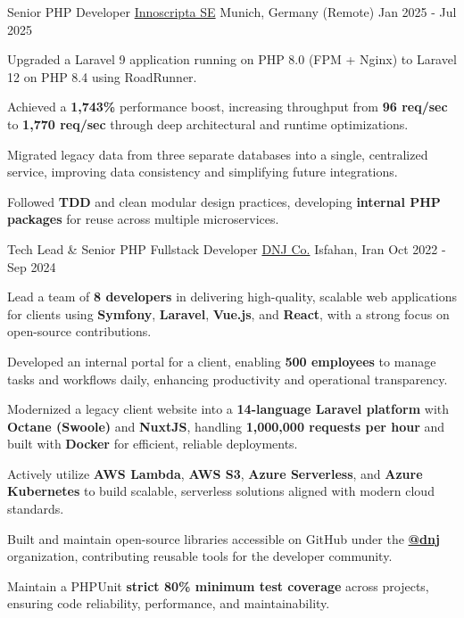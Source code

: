 
\begin{cventries}

  \cventry
    {Senior PHP Developer} %
    {\href{https://innoscripta.com}{Innoscripta SE}} %
    {Munich, Germany (Remote)} %
    {Jan 2025 - Jul 2025} %
    { 
      \begin{cvitems}
        \item {Upgraded a Laravel 9 application running on PHP 8.0 (FPM + Nginx) to Laravel 12 on PHP 8.4 using RoadRunner.}
        \item {Achieved a \textbf{1,743\%} performance boost, increasing throughput from \textbf{96 req/sec} to \textbf{1,770 req/sec} through deep architectural and runtime optimizations.}
        \item {Migrated legacy data from three separate databases into a single, centralized service, improving data consistency and simplifying future integrations.}
        \item {Followed \textbf{TDD} and clean modular design practices, developing \textbf{internal PHP packages} for reuse across multiple microservices.}
      \end{cvitems}
    }

  \cventry
    {Tech Lead \& Senior PHP Fullstack Developer} %
    {\href{https://dnj.co.ir}{DNJ Co.}} %
    {Isfahan, Iran} %
    {Oct 2022 - Sep 2024} %
    {
      \begin{cvitems}
        \item {Lead a team of \textbf{8 developers} in delivering high-quality, scalable web applications for clients using \textbf{Symfony}, \textbf{Laravel}, \textbf{Vue.js}, and \textbf{React}, with a strong focus on open-source contributions.}
        \item {Developed an internal portal for a client, enabling \textbf{500 employees} to manage tasks and workflows daily, enhancing productivity and operational transparency.}
        \item {Modernized a legacy client website into a \textbf{14-language Laravel platform} with \textbf{Octane (Swoole)} and \textbf{NuxtJS}, handling \textbf{1,000,000 requests per hour} and built with \textbf{Docker} for efficient, reliable deployments.}
        \item {Actively utilize \textbf{AWS Lambda}, \textbf{AWS S3}, \textbf{Azure Serverless}, and \textbf{Azure Kubernetes} to build scalable, serverless solutions aligned with modern cloud standards.}
        \item {Built and maintain open-source libraries accessible on GitHub under the \textbf{\href{https://github.com/dnj}{\faGithubSquare\acvHeaderIconSep @dnj}} organization, contributing reusable tools for the developer community.}
        \item {Maintain a PHPUnit \textbf{strict 80\% minimum test coverage} across projects, ensuring code reliability, performance, and maintainability.}
      \end{cvitems}
    }


\end{cventries}
